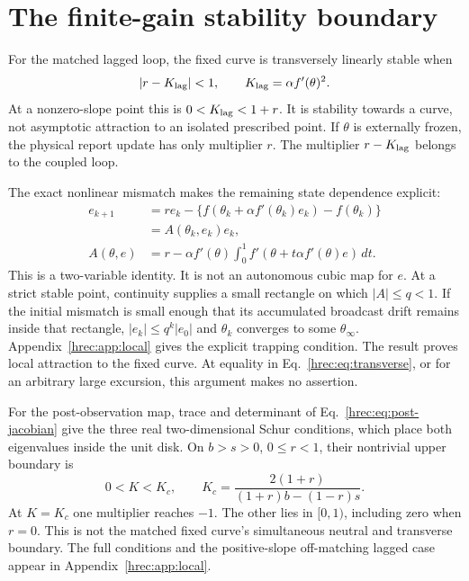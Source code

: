 \section{The finite-gain stability boundary}
\label{hrec:sec:stability}
For the matched lagged loop, the fixed curve is transversely linearly stable when
\begin{equation}
 |r-K_{\rm lag}|<1,\qquad K_{\rm lag}=\alpha f'(\theta)^2.
 \label{hrec:eq:transverse}
\end{equation}
At a nonzero-slope point this is \(0<K_{\rm lag}<1+r\). It is stability towards a curve, not asymptotic attraction to an isolated prescribed point. If \(\theta\) is externally frozen, the physical report update has only multiplier \(r\). The multiplier \(r-K_{\rm lag}\) belongs to the coupled loop.

The exact nonlinear mismatch makes the remaining state dependence explicit:
\begin{align}
 e_{k+1}&=r e_k-\{f(\theta_k+\alpha f'(\theta_k)e_k)-f(\theta_k)\}\nonumber\\
 &=A(\theta_k,e_k)e_k,\nonumber\\
 A(\theta,e)&=r-\alpha f'(\theta)\int_0^1
       f'(\theta+t\alpha f'(\theta)e)\,dt.
 \label{hrec:eq:secant}
\end{align}
This is a two-variable identity. It is not an autonomous cubic map for \(e\). At a strict stable point, continuity supplies a small rectangle on which \(|A|\le q<1\). If the initial mismatch is small enough that its accumulated broadcast drift remains inside that rectangle, \(|e_k|\le q^k|e_0|\) and \(\theta_k\) converges to some \(\theta_\infty\). Appendix~\ref{hrec:app:local} gives the explicit trapping condition. The result proves local attraction to the fixed curve. At equality in Eq.~\eqref{hrec:eq:transverse}, or for an arbitrary large excursion, this argument makes no assertion.

For the post-observation map, trace and determinant of Eq.~\eqref{hrec:eq:post-jacobian} give the three real two-dimensional Schur conditions, which place both eigenvalues inside the unit disk. On \(b>s>0\), \(0\le r<1\), their nontrivial upper boundary is
\begin{equation}
 0<K<K_c,\qquad
 K_c=\frac{2(1+r)}{(1+r)b-(1-r)s}.
 \label{hrec:eq:post-boundary}
\end{equation}
At \(K=K_c\) one multiplier reaches \(-1\). The other lies in \([0,1)\), including zero when \(r=0\). This is not the matched fixed curve's simultaneous neutral and transverse boundary. The full conditions and the positive-slope off-matching lagged case appear in Appendix~\ref{hrec:app:local}.

